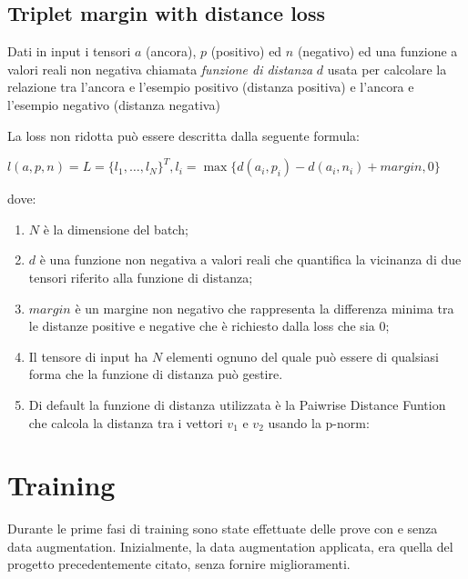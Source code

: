 \documentclass[11pt]{article}
\begin{document}
\subsection{Triplet margin with distance loss}
Dati in input i tensori $a$ (ancora), $p$ (positivo) ed $n$ (negativo) ed una funzione a valori
reali non negativa chiamata \textit{funzione di distanza} $d$ usata per calcolare la relazione tra
l'ancora e l'esempio positivo (distanza positiva) e l'ancora e l'esempio negativo (distanza negativa)

La loss non ridotta può essere descritta dalla seguente formula:

\begin{center}
    $l(a,p,n) = L = { \{ l_1, \ldots, l_N \}}^T, l_i = \max{\{ d(a_i, p_i) - d(a_i, n_i) + margin, 0 \}} $
\end{center}

dove:

\begin{enumerate}
    \item $N$ è la dimensione del batch;
    \item {$d$ è una funzione non negativa a valori reali che quantifica la vicinanza di due tensori riferito
    alla funzione di distanza;}
    \item {$margin$ 
        è un margine non negativo che rappresenta la differenza minima
        tra le distanze positive e negative che è richiesto dalla loss che sia 0;
    }
    \item Il tensore di input ha $N$ elementi ognuno del quale può essere di qualsiasi forma che la funzione di distanza può gestire.

    \item {
        Di default la funzione di distanza utilizzata è la Paiwrise Distance Funtion
        che calcola la distanza tra i vettori $v_1$ e $v_2$ usando la p-norm:
    }

\end{enumerate}



\section{Training}

Durante le prime fasi di training sono state effettuate delle prove con e senza data augmentation. Inizialmente, la data augmentation applicata,
era quella del progetto precedentemente citato, senza fornire miglioramenti.
\end{document}
